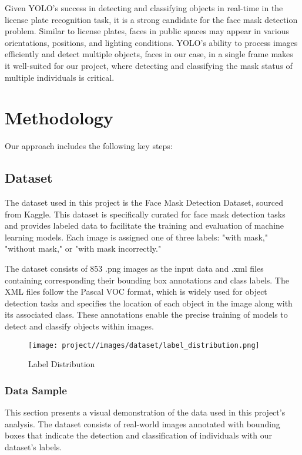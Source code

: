 \documentclass[11pt]{article}
\begin{document}
Given YOLO's success in detecting and classifying objects in real-time in the license plate recognition task, it is a strong candidate for the face mask detection problem. Similar to license plates, faces in public spaces may appear in various orientations, positions, and lighting conditions. YOLO’s ability to process images efficiently and detect multiple objects, faces in our case, in a single frame makes it well-suited for our project, where detecting and classifying the mask status of multiple individuals is critical.

\section{Methodology} 
Our approach includes the following key steps:

\subsection{Dataset}
The dataset used in this project is the Face Mask Detection Dataset, sourced from Kaggle. This dataset is specifically curated for face mask detection tasks and provides labeled data to facilitate the training and evaluation of machine learning models. Each image is assigned one of three labels: "with mask," "without mask," or "with mask incorrectly."

The dataset consists of 853 .png images as the input data and .xml files containing corresponding their bounding box annotations and class labels. The XML files follow the Pascal VOC format, which is widely used for object detection tasks and specifies the location of each object in the image along with its associated class. These annotations enable the precise training of models to detect and classify objects within images.

\begin{figure}[H]
    \centering
    \caption{Label Distribution}
    \label{fig:enter-label}
    \texttt{[image: project//images/dataset/label\_distribution.png]} %
\end{figure}


\subsubsection{Data Sample}
This section presents a visual demonstration of the data used in this project's analysis. The dataset consists of real-world images annotated with bounding boxes that indicate the detection and classification of individuals with our dataset's labels.
\end{document}
